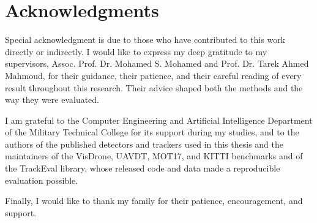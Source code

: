 \chapter*{Acknowledgments}

Special acknowledgment is due to those who have contributed to this work directly or indirectly. I would like to express my deep gratitude to my supervisors, Assoc. Prof. Dr. Mohamed S. Mohamed and Prof. Dr. Tarek Ahmed Mahmoud, for their guidance, their patience, and their careful reading of every result throughout this research. Their advice shaped both the methods and the way they were evaluated.

I am grateful to the Computer Engineering and Artificial Intelligence Department of the Military Technical College for its support during my studies, and to the authors of the published detectors and trackers used in this thesis and the maintainers of the VisDrone, UAVDT, MOT17, and KITTI benchmarks and of the TrackEval library, whose released code and data made a reproducible evaluation possible.

Finally, I would like to thank my family for their patience, encouragement, and support.
